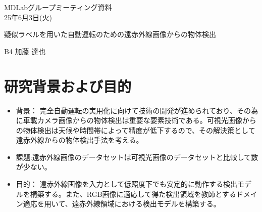 \documentclass[a4j]{jarticle}
\begin{document}
	\begin{flushright}
		MDLabグループミーティング資料\\
		25年6月3日(火)
	\end{flushright}

	\begin{center}
		{\Large	疑似ラベルを用いた自動運転のための遠赤外線画像からの物体検出}
	\end{center}

	\begin{flushright}
		{\large B4 加藤 達也}
	\end{flushright}

	\section{研究背景および目的}
	\begin{itemize}
		\item 背景： 完全自動運転の実用化に向けて技術の開発が進められており、その為に車載カメラ画像からの物体検出は重要な要素技術である。可視光画像からの物体検出は天候や時間帯によって精度が低下するので、その解決策として遠赤外線からの物体検出手法を考える。
		\item 課題:遠赤外線画像のデータセットは可視光画像のデータセットと比較して数が少ない。
		\item 目的： 遠赤外線画像を入力として低照度下でも安定的に動作する検出モデルを構築する。また、RGB画像に適応して得た検出領域を教師とするドメイン適応を用いて、遠赤外線領域における検出モデルを構築する。
	\end{itemize}
\end{document}
